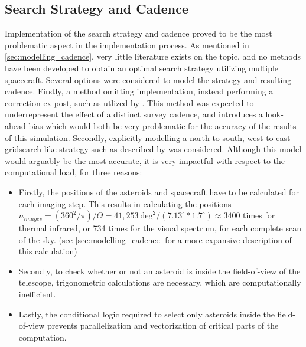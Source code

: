 \subsection{Search Strategy and Cadence}
Implementation of the search strategy and cadence proved to be the most problematic aspect in the implementation process. As mentioned in \autoref{sec:modelling_cadence}, very little literature exists on the topic, and no methods have been developed to obtain an optimal search strategy utilizing multiple spacecraft. Several options were considered to model the strategy and resulting cadence. Firstly, a method omitting implementation, instead performing a correction ex post, such as utlized by \cite{ThesisOlga}. This method was expected to underrepresent the effect of a distinct survey cadence, and introduces a look-ahead bias which would both be very problematic for the accuracy of the results of this simulation. Secondly, explicitly modelling a north-to-south, west-to-east gridsearch-like strategy such as described by \cite{NEOCam} was considered. Although this model would arguably be the most accurate, it is very impactful with respect to the computational load, for three reasons:
\begin{itemize}
 \item Firstly, the positions of the asteroids and spacecraft have to be calculated for each imaging step. This results in calculating the positions $n_{images} = (360^2/\pi) / \Theta = 41,253~\mathrm{deg}^2 / (7.13^\circ*1.7^\circ) \approx 3400$ times for thermal infrared, or 734 times for the visual spectrum, for each complete scan of the sky. (see \autoref{sec:modelling_cadence} for a more expansive description of this calculation)
 \item Secondly, to check whether or not an asteroid is inside the field-of-view of the telescope, trigonometric calculations are necessary, which are computationally inefficient.
 \item Lastly, the conditional logic required to select only asteroids inside the field-of-view prevents parallelization and vectorization of critical parts of the computation.
\end{itemize}
